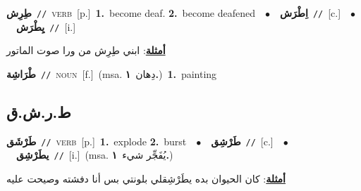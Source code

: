 \documentclass[10pt,a4paper,twoside]{article} %
\begin{document}
\begin{multicols}{2}
{\setlength\topsep{0pt}\textbf{\foreignlanguage{arabic}{طِرِش}}\ {\color{gray}\texttt{//}\color{black}}\ \textsc{verb}\ [p.]\ \textbf{1.}~become deaf.  \textbf{2.}~become deafened\ \ $\bullet$\ \ \setlength\topsep{0pt}\textbf{\foreignlanguage{arabic}{اِطْرَش}}\ {\color{gray}\texttt{//}\color{black}}\ [c.]\ \ $\bullet$\ \ \setlength\topsep{0pt}\textbf{\foreignlanguage{arabic}{يِطْرَش}}\ {\color{gray}\texttt{//}\color{black}}\ [i.]\  \begin{flushright}\color{gray}\foreignlanguage{arabic}{\textbf{\underline{\foreignlanguage{arabic}{أمثلة}}}: ابني طِرِش من ورا صوت الماتور}\end{flushright}\color{black}} \vspace{2mm}

{\setlength\topsep{0pt}\textbf{\foreignlanguage{arabic}{طْرَاشِة}}\ {\color{gray}\texttt{//}\color{black}}\ \textsc{noun}\ [f.]\ \color{gray}(msa. \foreignlanguage{arabic}{دِهان}~\foreignlanguage{arabic}{\textbf{١.}})\color{black}\ \textbf{1.}~painting\ } \vspace{2mm}

\vspace{-3mm}
\subsection*{\color{blue}\foreignlanguage{arabic}{ط.ر.ش.ق}\color{blue}{}} 

{\setlength\topsep{0pt}\textbf{\foreignlanguage{arabic}{طَرْشَق}}\ {\color{gray}\texttt{//}\color{black}}\ \textsc{verb}\ [p.]\ \textbf{1.}~explode  \textbf{2.}~burst\ \ $\bullet$\ \ \setlength\topsep{0pt}\textbf{\foreignlanguage{arabic}{طَرْشِق}}\ {\color{gray}\texttt{//}\color{black}}\ [c.]\ \ $\bullet$\ \ \setlength\topsep{0pt}\textbf{\foreignlanguage{arabic}{يطَرْشِق}}\ {\color{gray}\texttt{//}\color{black}}\ [i.]\ \color{gray}(msa. \foreignlanguage{arabic}{يُفَجِّر شيء}~\foreignlanguage{arabic}{\textbf{١.}})\color{black}\  \begin{flushright}\color{gray}\foreignlanguage{arabic}{\textbf{\underline{\foreignlanguage{arabic}{أمثلة}}}: كان الحيوان بده يطَرْشِقلي بلونتي بس أنا دفشته وصيحت عليه}\end{flushright}\color{black}} \vspace{2mm}


\end{multicols}
\end{document}
